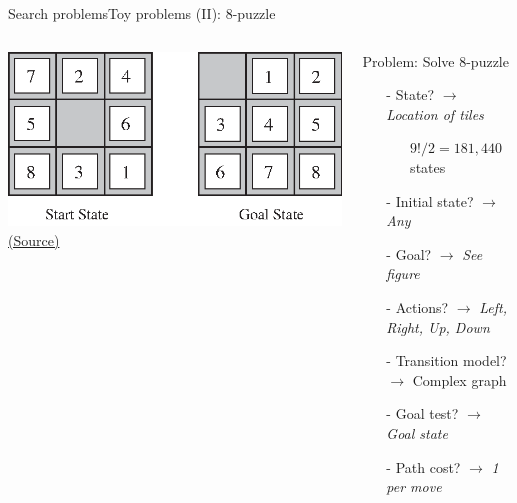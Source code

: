 \documentclass[10pt,compress]{beamer} %
\begin{document}
\begin{frame}{Search problems}{Toy problems (II): 8-puzzle}
       \begin{columns}
	            \centering \includegraphics[width=\linewidth]{figs/8puzzle.eps}\\
	            \tiny{\href{http://aima.cs.berkeley.edu/index.html}{(Source)}}
                \begin{exampleblock}{Problem: Solve 8-puzzle}
                    \begin{itemize}
                    \item[-] State? $\rightarrow$ \textit{Location of tiles}
                        \begin{itemize}
                            \item[] $9!/2 = 181,440$ states
                        \end{itemize}
                    \item[-] Initial state? $\rightarrow$ \textit{Any}
                    \item[-] Goal? $\rightarrow$ \textit{See figure}
                    \item[-] Actions? $\rightarrow$ \textit{Left, Right, Up, Down}
                    \item[-] Transition model? $\rightarrow$ Complex graph
                    \item[-] Goal test? $\rightarrow$ \textit{Goal state}
                    \item[-] Path cost? $\rightarrow$ \textit{1 per move}
                    \end{itemize}
                \end{exampleblock}

      \end{columns}
\end{frame}
\end{document}
